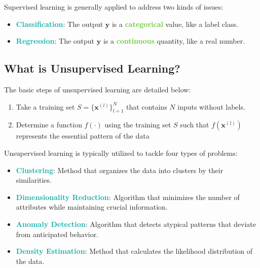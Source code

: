 \documentclass[twoside]{article}
\newcommand{\highlightbluetext}[1]{\textcolor[HTML]{09ACA6}{\textbf{#1}}}
\newcommand{\highlightgreentext}[1]{\textcolor[HTML]{62C92F}{\textbf{#1}}}
\numberwithin{equation}{section}
\begin{document}
	Supervised learning is generally applied to address two kinds of issues: 
	\begin{itemize} 
		\item \highlightbluetext{Classification}: The output $\mathbf{y}$ is a \highlightgreentext{categorical} value, like a label class. 
		\item \highlightbluetext{Regression}: The output $\mathbf{y}$ is a \highlightgreentext{continuous} quantity, like a real number. 
	\end{itemize}

	\subsection{What is Unsupervised Learning?}
	\label{subsec:WhatIsUnsupervisedLearning}

	The basic steps of unsupervised learning are detailed below:
	\begin{enumerate}
		\item Take a training set $S = \{\mathbf{x}^{(l)}\}_{l=1}^N$ that contains $N$ inputs without labels.
		\item Determine a function $f(\cdot)$ using the training set $S$ such that $f(\mathbf{x}^{(l)})$ represents the essential pattern of the data
	\end{enumerate}

	Unsupervised learning is typically utilized to tackle four types of problems:
	\begin{itemize}
		\item \highlightbluetext{Clustering}: Method that organizes the data into clusters by their similarities. 
		\item \highlightbluetext{Dimensionality Reduction}: Algorithm that minimizes the number of attributes while maintaining crucial information. 
		\item \highlightbluetext{Anomaly Detection}: Algorithm that detects atypical patterns that deviate from anticipated behavior. 
		\item \highlightbluetext{Density Estimation}: Method that calculates the likelihood distribution of the data. 
	\end{itemize}

	\newpage
\end{document}
